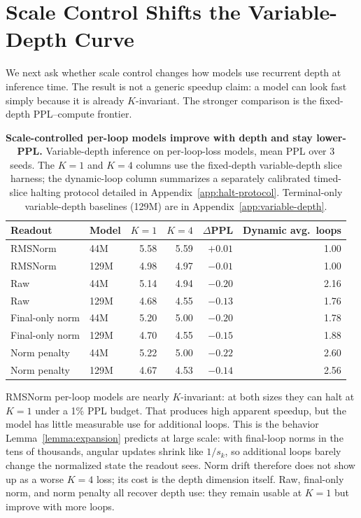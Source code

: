 \section{Scale Control Shifts the Variable-Depth Curve}
\label{sec:depth}

We next ask whether scale control changes how models use recurrent depth at inference time.
The result is not a generic speedup claim: a model can look fast simply because it is already $K$-invariant.
The stronger comparison is the fixed-depth PPL--compute frontier.

\begin{table}[t]
\centering
\small
\caption{\textbf{Scale-controlled per-loop models improve with depth and stay lower-PPL.}
Variable-depth inference on per-loop-loss models, mean PPL over 3 seeds. The $K=1$ and $K=4$ columns use the fixed-depth variable-depth slice harness; the dynamic-loop column summarizes a separately calibrated timed-slice halting protocol detailed in Appendix~\ref{app:halt-protocol}. Terminal-only variable-depth baselines (129M) are in Appendix~\ref{app:variable-depth}.}
\label{tab:depth}
\begin{tabular}{llrrrr}
\toprule
\textbf{Readout} & \textbf{Model} & $K=1$ & $K=4$ & $\Delta$PPL & Dynamic avg.\ loops \\
\midrule
RMSNorm & 44M & 5.58 & 5.59 & $+0.01$ & 1.00 \\
RMSNorm & 129M & 4.98 & 4.97 & $-0.01$ & 1.00 \\
Raw & 44M & 5.14 & 4.94 & $-0.20$ & 2.16 \\
Raw & 129M & 4.68 & 4.55 & $-0.13$ & 1.76 \\
Final-only norm & 44M & 5.20 & 5.00 & $-0.20$ & 1.78 \\
Final-only norm & 129M & 4.70 & 4.55 & $-0.15$ & 1.88 \\
Norm penalty & 44M & 5.22 & 5.00 & $-0.22$ & 2.60 \\
Norm penalty & 129M & 4.67 & 4.53 & $-0.14$ & 2.56 \\
\bottomrule
\end{tabular}
\end{table}

RMSNorm per-loop models are nearly $K$-invariant: at both sizes they can halt at $K=1$ under a 1\% PPL budget.
That produces high apparent speedup, but the model has little measurable use for additional loops.
This is the behavior Lemma~\ref{lemma:expansion} predicts at large scale: with final-loop norms in the tens of thousands, angular updates shrink like $1/s_k$, so additional loops barely change the normalized state the readout sees.
Norm drift therefore does not show up as a worse $K=4$ loss; its cost is the depth dimension itself.
Raw, final-only norm, and norm penalty all recover depth use: they remain usable at $K=1$ but improve with more loops.

